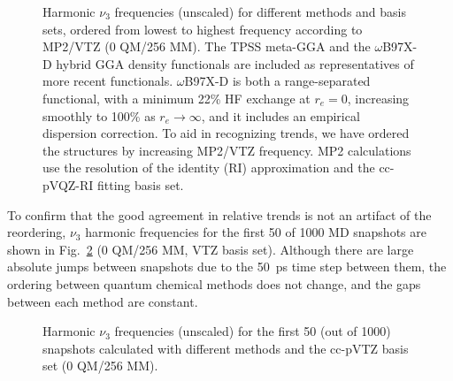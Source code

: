 \begin{figure}[h]
  \centering
  \caption{Harmonic \(\nu_{3}\) frequencies (unscaled) for different methods and basis sets, ordered from lowest to highest frequency according to MP2/VTZ (0 QM/256 MM). The TPSS meta-GGA\cite{Tao2003} and the \(\omega\)B97X-D\cite{Chai2008} hybrid GGA density functionals are included as representatives of more recent functionals. \(\omega\)B97X-D is both a range-separated functional, with a minimum 22\% HF exchange at \(r_{e} = 0\), increasing smoothly to 100\% as \(r_{e} \rightarrow \infty\), and it includes an empirical dispersion correction. To aid in recognizing trends, we have ordered the structures by increasing MP2/VTZ frequency. MP2 calculations use the resolution of the identity (RI) approximation\cite{Feyereisen1993,Weigend1997,Distasio2007} and the cc-pVQZ-RI fitting basis set\cite{Weigend2002}.}
  \label{paper_02:fig:S3}
\end{figure}

To confirm that the good agreement in relative trends is not an artifact of the reordering,  \(\nu_{3}\) harmonic frequencies for the first \num{50} of \num{1000} MD snapshots are shown in Fig.~\ref{paper_02:fig:S4} (0 QM/256 MM, VTZ basis set). Although there are large absolute jumps between snapshots due to the \SI{50}{\pico\second} time step between them, the ordering between quantum chemical methods does not change, and the gaps between each method are constant.

\begin{figure}[h]
  \centering
  \caption{Harmonic \(\nu_{3}\) frequencies (unscaled) for the first \num{50} (out of \num{1000}) snapshots calculated with different methods and the cc-pVTZ basis set (0 QM/256 MM).}
  \label{paper_02:fig:S4}
\end{figure}

